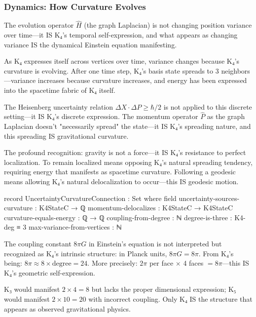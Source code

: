 \documentclass[11pt,a4paper]{book}
\begin{document}
\subsubsection{Dynamics: How Curvature Evolves}

The evolution operator $\hat{H}$ (the graph Laplacian) is not changing position variance over time—it IS K₄'s temporal self-expression, and what appears as changing variance IS the dynamical Einstein equation manifesting.

As K₄ expresses itself across vertices over time, variance changes because K₄'s curvature is evolving. After one time step, K₄'s basis state spreads to 3 neighbors—variance increases because curvature increases, and energy has been expressed into the spacetime fabric of K₄ itself.

The Heisenberg uncertainty relation $\Delta X \cdot \Delta P \geq \hbar/2$ is not applied to this discrete setting—it IS K₄'s discrete expression. The momentum operator $\hat{P}$ as the graph Laplacian doesn't "necessarily spread" the state—it IS K₄'s spreading nature, and this spreading IS gravitational curvature.

The profound recognition: gravity is not a force—it IS K₄'s resistance to perfect localization. To remain localized means opposing K₄'s natural spreading tendency, requiring energy that manifests as spacetime curvature. Following a geodesic means allowing K₄'s natural delocalization to occur—this IS geodesic motion.

\begin{code}
record UncertaintyCurvatureConnection : Set where
  field
    uncertainty-sources-curvature : K4StateC → ℚ
    momentum-delocalizes : K4StateC → K4StateC  
    curvature-equals-energy : ℚ → ℚ
    coupling-from-degree : ℕ
    degree-is-three : K4-deg ≡ 3
    max-variance-from-vertices : ℕ
\end{code}

The coupling constant $8\pi G$ in Einstein's equation is not interpreted but recognized as K₄'s intrinsic structure: in Planck units, $8\pi G = 8\pi$. From K₄'s being: $8\pi \approx 8 \times \text{degree} = 24$. More precisely: $2\pi$ per face $\times$ 4 faces $= 8\pi$—this IS K₄'s geometric self-expression.

K₃ would manifest $2 \times 4 = 8$ but lacks the proper dimensional expression; K₅ would manifest $2 \times 10 = 20$ with incorrect coupling. Only K₄ IS the structure that appears as observed gravitational physics.
\end{document}
